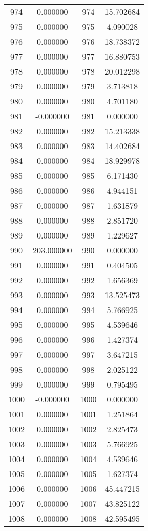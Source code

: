 \documentclass[12pt]{article}
\begin{document}
\begin{longtable}{@{}cccc@{}}
974 & 0.000000 & 974 & 15.702684 \\
975 & 0.000000 & 975 & 4.090028 \\
976 & 0.000000 & 976 & 18.738372 \\
977 & 0.000000 & 977 & 16.880753 \\
978 & 0.000000 & 978 & 20.012298 \\
979 & 0.000000 & 979 & 3.713818 \\
980 & 0.000000 & 980 & 4.701180 \\
981 & -0.000000 & 981 & 0.000000 \\
982 & 0.000000 & 982 & 15.213338 \\
983 & 0.000000 & 983 & 14.402684 \\
984 & 0.000000 & 984 & 18.929978 \\
985 & 0.000000 & 985 & 6.171430 \\
986 & 0.000000 & 986 & 4.944151 \\
987 & 0.000000 & 987 & 1.631879 \\
988 & 0.000000 & 988 & 2.851720 \\
989 & 0.000000 & 989 & 1.229627 \\
990 & 203.000000 & 990 & 0.000000 \\
991 & 0.000000 & 991 & 0.404505 \\
992 & 0.000000 & 992 & 1.656369 \\
993 & 0.000000 & 993 & 13.525473 \\
994 & 0.000000 & 994 & 5.766925 \\
995 & 0.000000 & 995 & 4.539646 \\
996 & 0.000000 & 996 & 1.427374 \\
997 & 0.000000 & 997 & 3.647215 \\
998 & 0.000000 & 998 & 2.025122 \\
999 & 0.000000 & 999 & 0.795495 \\
1000 & -0.000000 & 1000 & 0.000000 \\
1001 & 0.000000 & 1001 & 1.251864 \\
1002 & 0.000000 & 1002 & 2.825473 \\
1003 & 0.000000 & 1003 & 5.766925 \\
1004 & 0.000000 & 1004 & 4.539646 \\
1005 & 0.000000 & 1005 & 1.627374 \\
1006 & 0.000000 & 1006 & 45.447215 \\
1007 & 0.000000 & 1007 & 43.825122 \\
1008 & 0.000000 & 1008 & 42.595495 \\

\end{longtable}
\end{document}
